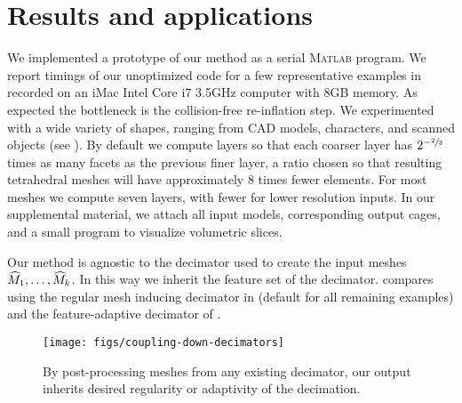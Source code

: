 \section{Results and applications}
\label{sec:results}

We implemented a prototype of our method as a serial \textsc{Matlab} program.
%
We report timings of our unoptimized code for a few representative examples in
 recorded on an iMac Intel Core i7 3.5GHz computer with 8GB
memory.
%
As expected the bottleneck is the collision-free re-inflation step.
%
We experimented with a wide variety of shapes, ranging from CAD models,
characters, and scanned objects (see ). By default we compute
layers so that each coarser layer has $2^{-\sfrac{2}{3}}$ times as many facets as
the previous finer layer, a ratio chosen so that resulting tetrahedral
meshes will have approximately $8$ times fewer elements. For most
meshes we compute seven layers, with fewer for lower resolution inputs.
%
In our supplemental material, we attach all input models, corresponding output
cages, and a small program to visualize volumetric slices.



Our method is agnostic to the decimator used to create the input meshes
$\widehat{M}_1,\dots,\widehat{M}_k$. In this way we inherit the feature set of the
decimator. 
%
compares using the regular mesh inducing decimator in \cite{cgal} (default for
all remaining examples) and the feature-adaptive decimator of \cite{openmesh}.

\begin{figure}
  \texttt{[image: figs/coupling-down-decimators]}
  \caption{By post-processing meshes from any existing decimator, our output
  inherits desired regularity or adaptivity of the decimation.}
  \label{fig:decimations}
\end{figure}

%
%

